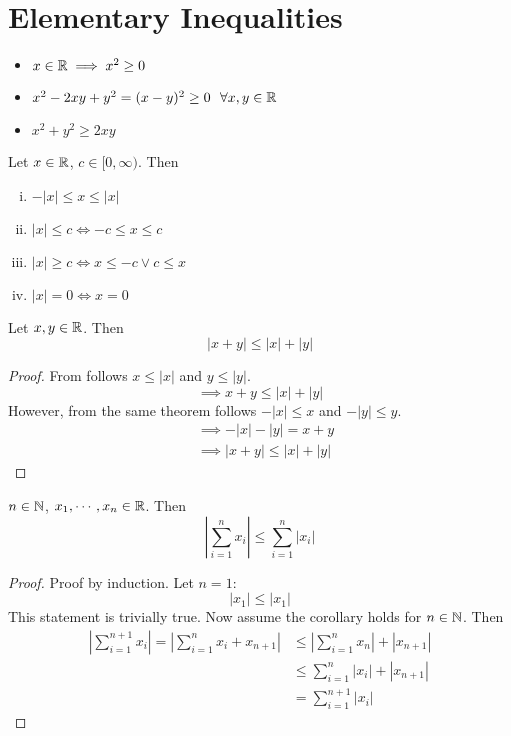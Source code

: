 \documentclass[../../script.tex]{subfiles}
\begin{document}
\section{Elementary Inequalities}
\begin{eg}\leavevmode
\begin{itemize}
	\item $x \in \mathbb{R} \implies x^2 \ge 0$
	\item $x^2 - 2xy + y^2 = (x - y)^2 \ge 0 ~~\forall x, y \in \mathbb{R}$
	\item $x^2 + y^2 \ge 2xy$
\end{itemize}
\end{eg}

\begin{thm}\label{thm:abs}
Let $x \in \mathbb{R}$, $c \in [0, \infty)$. Then
\begin{enumerate}[(i)]
	\item $-|x| \le x \le |x|$
	\item $|x| \le c \iff -c \le x \le c$
	\item $|x| \ge c \iff x \le -c \vee c \le x$
	\item $|x| = 0 \iff x = 0$
\end{enumerate}
\end{thm}

\begin{thm}\label{thm:triangle}
Let $x, y \in \mathbb{R}$. Then
\[
	|x + y| \le |x| + |y|
\]
\end{thm}
\begin{proof}
From  follows $x \le |x|$ and $y \le |y|$.
\begin{equation}
	\implies x + y \le |x| + |y|
\end{equation}
However, from the same theorem follows $-|x| \le x$ and $-|y| \le y$.
\begin{align}
	&\implies -|x|-|y| = x + y \\
	&\implies |x + y| \le |x| + |y|
\end{align}
\end{proof}

\begin{cor}
$n \in \mathbb{N}$, $x_1, \cdots, x_n \in \mathbb{R}$. Then
\[
	\left| \sum_{i=1}^n x_i \right| \le \sum_{i=1}^n |x_i|
\]
\end{cor}
\begin{proof}
Proof by induction. Let $n = 1$:
\begin{equation}
	|x_1| \le |x_1|
\end{equation}
This statement is trivially true. Now assume the corollary holds for $n \in \mathbb{N}$. Then
\begin{equation}
\begin{split}
	\left| \sum_{i=1}^{n+1} x_i \right| = \left| \sum_{i=1}^n x_i + x_{n+1} \right| &\le \left| \sum_{i=1}^n  x_n \right| + |x_{n+1}| \\
	&\le \sum_{i=1}^n |x_i| + |x_{n+1}| \\
	&= \sum_{i=1}^{n+1} |x_i|
\end{split}
\end{equation}
\end{proof}
\end{document}
